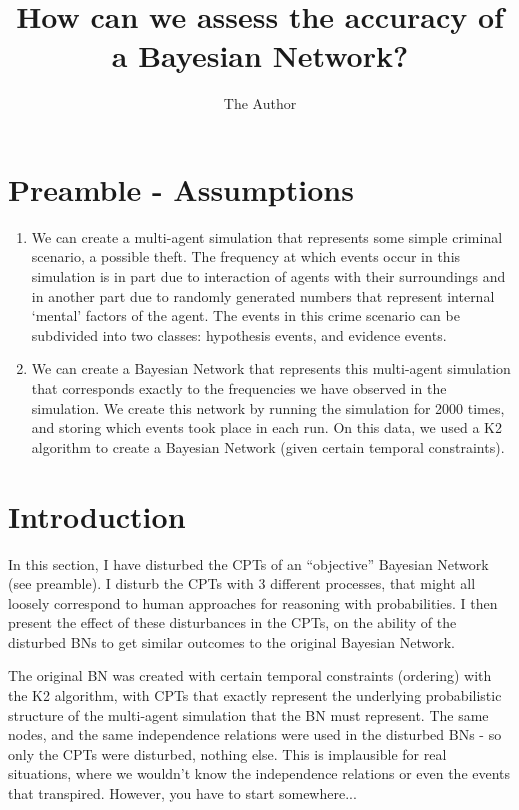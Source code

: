 \documentclass[11pt]{amsart}
\title{How can we assess the accuracy of a Bayesian Network?}
\author{The Author}
\begin{document}
\maketitle

\section{Preamble - Assumptions}
\begin{enumerate}
\item We can create a multi-agent simulation that represents some simple criminal scenario, a possible theft. The frequency at which events occur in this simulation is in part due to interaction of agents with their surroundings and in another part due to randomly generated numbers that represent internal `mental' factors of the agent. The events in this crime scenario can be subdivided into two classes: hypothesis events, and evidence events.
\item We can create a Bayesian Network that represents this multi-agent simulation that corresponds exactly to the frequencies we have observed in the simulation. We create this network by running the simulation for 2000 times, and storing which events took place in each run. On this data, we used a K2 algorithm to create a Bayesian Network (given certain temporal constraints).
\end{enumerate}


\section{Introduction}
In this section, I have disturbed the CPTs of an ``objective'' Bayesian Network (see preamble). I disturb the CPTs with 3 different processes, that might all loosely correspond to human approaches for reasoning with probabilities. I then present the effect of these disturbances in the CPTs, on the ability of the disturbed BNs to get similar outcomes to the original Bayesian Network. 

 The original BN was created with certain temporal constraints (ordering) with the K2 algorithm, with CPTs that exactly represent the underlying probabilistic structure of the multi-agent simulation that the BN must represent. The same nodes, and the same independence relations were used in the disturbed BNs - so only the CPTs were disturbed, nothing else. This is implausible for real situations, where we wouldn't know the independence relations or even the events that transpired. However, you have to start somewhere...
\end{document}

